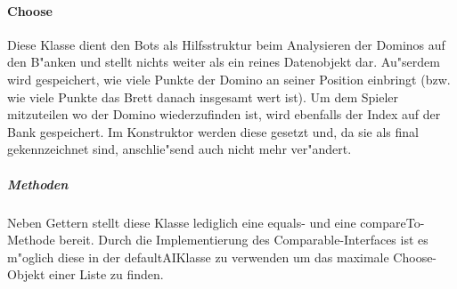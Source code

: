 \paragraph{Choose}
\label{par:choose}
Diese Klasse dient den Bots als Hilfsstruktur beim Analysieren der Dominos auf den B"anken und stellt nichts weiter als ein reines Datenobjekt dar. Au"serdem wird gespeichert, wie viele Punkte der Domino an seiner Position einbringt (bzw. wie viele Punkte das Brett danach insgesamt wert ist). Um dem Spieler mitzuteilen wo der Domino wiederzufinden ist, wird ebenfalls der Index auf der Bank gespeichert. Im Konstruktor werden diese gesetzt und, da sie als final gekennzeichnet sind, anschlie"send auch nicht mehr ver"andert. 

\subparagraph{Methoden}
Neben Gettern stellt diese Klasse lediglich eine equals- und eine compareTo-Methode bereit. Durch die Implementierung des Comparable-Interfaces ist es m"oglich diese in der defaultAIKlasse zu verwenden um das maximale Choose-Objekt einer Liste zu finden. 
